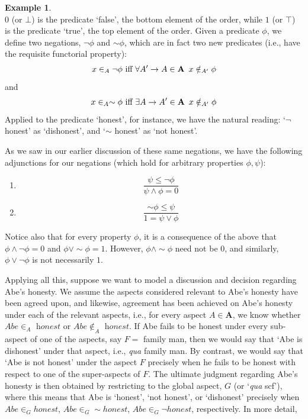 \documentclass[11pt]{book}
\theoremstyle{definition}
\newtheorem{example}{Example}[section]
\theoremstyle{definition}
\theoremstyle{definition}
\theoremstyle{theorem}
\theoremstyle{definition}
\begin{document}
\begin{example}
\begin{equation*}
	\end{equation*}
	$0$ (or $\bot$) is the predicate `false', the bottom element of the order, while $1$ (or $\top$) is the predicate `true', the top element of the order. Given a predicate $\phi$, we define two negations, $\neg \phi$ and $\sim \phi$, which are in fact two new predicates (i.e., have the requisite functorial property): 
	\begin{equation*}
	x \in_A \neg \phi \text{ iff } \forall A' \rightarrow A \in \textbf{A} \hspace*{0.5em} x \notin_{A'} \phi
	\end{equation*}
	and 
	\begin{equation*}
	x \in_A \sim \phi \text{ iff } \exists A \rightarrow A' \in \textbf{A} \hspace*{0.5em} x \notin_{A'} \phi
	\end{equation*}
	Applied to the predicate `honest', for instance, we have the natural reading: `$\neg$ honest' as `dishonest', and `$\sim$ honest' as `not honest'. 
	\par 
	As we saw in our earlier discussion of these same negations, we have the following adjunctions for our negations (which hold for arbitrary properties $\phi, \psi$): 
	\begin{enumerate}
		\item \begin{equation*}
		\frac{\psi \leq \neg \phi}{\psi \wedge \phi = 0}
		\end{equation*}
		\item \begin{equation*}
		\frac{\sim \phi \leq \psi}{1 = \psi \vee \phi}
		\end{equation*}
	\end{enumerate}
	Notice also that for every property $\phi$, it is a consequence of the above that $\phi \wedge \neg \phi = 0$ and $\phi \vee \sim \phi = 1$. However, $\phi \wedge \sim \phi$ need not be $0$, and similarly, $\phi \vee \neg \phi$ is not necessarily $1$. \par 
	Applying all this, suppose we want to model a discussion and decision regarding Abe's honesty. We assume the aspects considered relevant to Abe's honesty have been agreed upon, and likewise, agreement has been achieved on Abe's honesty under each of the relevant aspects, i.e., for every aspect $A \in \textbf{A}$, we know whether $Abe \in_A \textit{ honest}$ or $Abe \notin_A \textit{ honest}$. If Abe fails to be honest under every sub-aspect of one of the aspects, say $F = $ family man, then we would say that `Abe is dishonest' under that aspect, i.e., \textit{qua} family man. By contrast, we would say that `Abe is not honest' under the aspect $F$ precisely when he fails to be honest with respect to one of the super-aspects of $F$. The ultimate judgment regarding Abe's honesty is then obtained by restricting to the global aspect, $G$ (or `\textit{qua} scf'), where this means that Abe is `honest', `not honest', or `dishonest' precisely when $Abe \in_G honest$, $Abe \in_G \sim honest$, $Abe \in_G \neg honest$, respectively. In more detail, 

\end{example}
\end{document}
